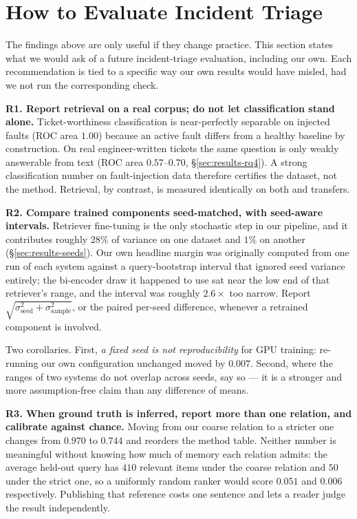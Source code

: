 \section{How to Evaluate Incident Triage}
\label{sec:recommendations}

The findings above are only useful if they change practice. This section states
what we would ask of a future incident-triage evaluation, including our own.
Each recommendation is tied to a specific way our own results would have
misled, had we not run the corresponding check.

\smallskip
\noindent\textbf{R1. Report retrieval on a real corpus; do not let
classification stand alone.} Ticket-worthiness classification is near-perfectly
separable on injected faults (ROC area $1.00$) because an active fault differs
from a healthy baseline by construction. On real engineer-written tickets the
same question is only weakly answerable from text (ROC area $0.57$--$0.70$,
\S\ref{sec:results-rq4}). A strong classification number on fault-injection data
therefore certifies the dataset, not the method. Retrieval, by contrast, is
measured identically on both and transfers.

\smallskip
\noindent\textbf{R2. Compare trained components seed-matched, with seed-aware
intervals.} Retriever fine-tuning is the only stochastic step in our pipeline,
and it contributes roughly $28\%$ of  variance on one dataset and $1\%$
on another (\S\ref{sec:results-seeds}). Our own headline margin was originally
computed from one run of each system against a query-bootstrap interval that
ignored seed variance entirely; the bi-encoder draw it happened to use sat near
the low end of that retriever's range, and the interval was roughly $2.6\times$
too narrow. Report $\sqrt{\sigma^2_{\text{seed}}+\sigma^2_{\text{sample}}}$, or
the paired per-seed difference, whenever a retrained component is involved.

Two corollaries. First, \emph{a fixed seed is not reproducibility} for GPU
training: re-running our own configuration unchanged moved  by $0.007$.
Second, where the ranges of two systems do not overlap across seeds, say so ---
it is a stronger and more assumption-free claim than any difference of means.

\smallskip
\noindent\textbf{R3. When ground truth is inferred, report more than one
relation, and calibrate against chance.} Moving from our coarse relation to a
stricter one changes  from $0.970$ to $0.744$ and reorders the method
table. Neither number is meaningful without knowing how much of memory each
relation admits: the average held-out query has $410$ relevant items under the
coarse relation and $50$ under the strict one, so a uniformly random ranker
would score $0.051$ and $0.006$ respectively. Publishing that reference costs
one sentence and lets a reader judge the result independently.

